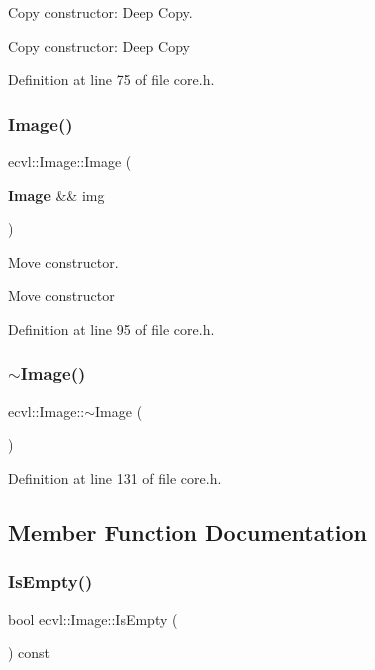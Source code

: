 Copy constructor\+: Deep Copy. 

Copy constructor\+: Deep Copy 

Definition at line 75 of file core.\+h.

\mbox{\label{classecvl_1_1_image_a70fcbb845cf9e5571abf1f9ca396b0ea}} 
\subsubsection{Image()\hspace{0.1cm}{\footnotesize\ttfamily [4/4]}}
{\footnotesize\ttfamily ecvl\+::\+Image\+::\+Image (\begin{DoxyParamCaption}\item[{\textbf{ Image} \&\&}]{img }\end{DoxyParamCaption})\hspace{0.3cm}{\ttfamily [inline]}}



Move constructor. 

Move constructor 

Definition at line 95 of file core.\+h.

\mbox{\label{classecvl_1_1_image_a2230eb993f310b23cf7624db0d42ee7c}} 
\subsubsection{$\sim$Image()}
{\footnotesize\ttfamily ecvl\+::\+Image\+::$\sim$\+Image (\begin{DoxyParamCaption}{ }\end{DoxyParamCaption})\hspace{0.3cm}{\ttfamily [inline]}}



Definition at line 131 of file core.\+h.



\subsection{Member Function Documentation}
\mbox{\label{classecvl_1_1_image_ab7dfe59beca83e189162378368dc4484}} 
\subsubsection{IsEmpty()}
{\footnotesize\ttfamily bool ecvl\+::\+Image\+::\+Is\+Empty (\begin{DoxyParamCaption}{ }\end{DoxyParamCaption}) const\hspace{0.3cm}{\ttfamily [inline]}}



